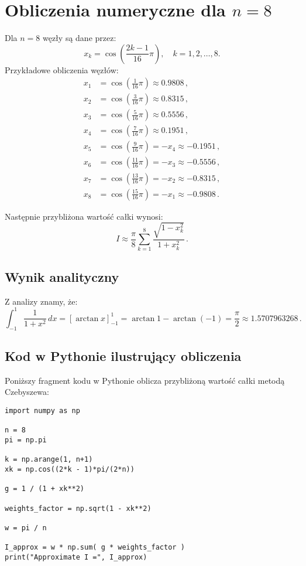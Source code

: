 \documentclass[a4paper,12pt]{article}
\begin{document}
\section{Obliczenia numeryczne dla \(n=8\)}
Dla \( n = 8 \) węzły są dane przez:
\[
x_k = \cos\left(\frac{2k-1}{16}\pi\right),\quad k=1,2,\dots,8.
\]
Przykładowe obliczenia węzłów:
\begin{align*}
x_1 &= \cos\left(\frac{1}{16}\pi\right) \approx 0.9808\,,\\[1mm]
x_2 &= \cos\left(\frac{3}{16}\pi\right) \approx 0.8315\,,\\[1mm]
x_3 &= \cos\left(\frac{5}{16}\pi\right) \approx 0.5556\,,\\[1mm]
x_4 &= \cos\left(\frac{7}{16}\pi\right) \approx 0.1951\,,\\[1mm]
x_5 &= \cos\left(\frac{9}{16}\pi\right) = -x_4 \approx -0.1951\,,\\[1mm]
x_6 &= \cos\left(\frac{11}{16}\pi\right) = -x_3 \approx -0.5556\,,\\[1mm]
x_7 &= \cos\left(\frac{13}{16}\pi\right) = -x_2 \approx -0.8315\,,\\[1mm]
x_8 &= \cos\left(\frac{15}{16}\pi\right) = -x_1 \approx -0.9808\,.
\end{align*}

Następnie przybliżona wartość całki wynosi:
\[
I \approx \frac{\pi}{8} \sum_{k=1}^{8} \frac{\sqrt{1 - x_k^2}}{1+x_k^2}\,.
\]

\subsection*{Wynik analityczny}
Z analizy znamy, że:
\[
\int_{-1}^{1}\frac{1}{1+x^2}\,dx = \left[\arctan x\right]_{-1}^{1} = \arctan 1-\arctan(-1)= \frac{\pi}{2}\approx 1.5707963268\,.
\]

\subsection*{Kod w Pythonie ilustrujący obliczenia}
Poniższy fragment kodu w Pythonie oblicza przybliżoną wartość całki metodą Czebyszewa:
\begin{lstlisting}[caption={Obliczenie całki metodą Czebyszewa dla \(n=8\)}, label=lst:cheb]
import numpy as np

n = 8
pi = np.pi

k = np.arange(1, n+1)
xk = np.cos((2*k - 1)*pi/(2*n))

g = 1 / (1 + xk**2)

weights_factor = np.sqrt(1 - xk**2)

w = pi / n

I_approx = w * np.sum( g * weights_factor )
print("Approximate I =", I_approx)
\end{lstlisting}
\end{document}
